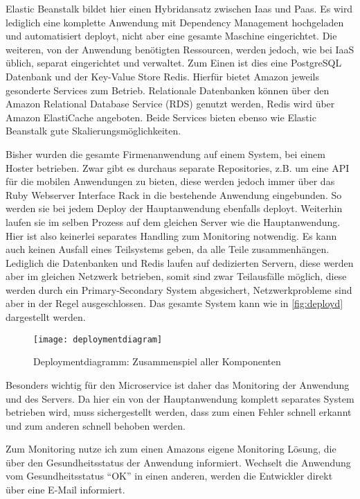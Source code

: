 Elastic Beanstalk bildet hier einen Hybridansatz zwischen Iaas und Paas. Es wird lediglich eine komplette Anwendung mit Dependency Management hochgeladen und automatisiert deployt, nicht aber eine gesamte Maschine eingerichtet.
Die weiteren, von der Anwendung benötigten Ressourcen, werden jedoch, wie bei IaaS üblich, separat eingerichtet und verwaltet. Zum Einen ist dies eine PostgreSQL Datenbank und der Key-Value Store Redis. Hierfür bietet Amazon jeweils gesonderte Services zum Betrieb. Relationale Datenbanken können über den Amazon Relational Database Service (RDS) \cite{aws:rds} genutzt werden, Redis wird über Amazon ElastiCache \cite{aws:elasticache} angeboten. Beide Services bieten ebenso wie Elastic Beanstalk gute Skalierungsmöglichkeiten.

Bisher wurden die gesamte Firmenanwendung auf einem System, bei einem Hoster betrieben. Zwar gibt es durchaus separate Repositories, z.B. um eine API für die mobilen Anwendungen zu bieten, diese werden jedoch immer über das Ruby Webserver Interface Rack in die bestehende Anwendung eingebunden. So werden sie bei jedem Deploy der Hauptanwendung ebenfalls deployt. Weiterhin laufen sie im selben Prozess auf dem gleichen Server wie die Hauptanwendung. Hier ist also keinerlei separates Handling zum Monitoring notwendig. Es kann auch keinen Ausfall eines Teilsystems geben, da alle Teile zusammenhängen. Lediglich die Datenbanken und Redis laufen auf dedizierten Servern, diese werden aber im gleichen Netzwerk betrieben, somit sind zwar Teilausfälle möglich, diese werden durch ein Primary-Secondary System abgesichert, Netzwerkprobleme sind aber in der Regel ausgeschlossen. Das gesamte System kann wie in \autoref{fig:deployd} dargestellt werden.

\begin{figure}[!ht]
    \centering
    \caption{Deploymentdiagramm: Zusammenspiel aller Komponenten}
    \label{fig:deployd}
    \texttt{[image: deploymentdiagram]}
\end{figure}

Besonders wichtig für den Microservice ist daher das Monitoring der Anwendung und des Servers. Da hier ein von der Hauptanwendung komplett separates System betrieben wird, muss sichergestellt werden, dass zum einen Fehler schnell erkannt und zum anderen schnell behoben werden. 

Zum Monitoring nutze ich zum einen Amazons eigene Monitoring Lösung, die über den Gesundheitsstatus der Anwendung informiert. Wechselt die Anwendung vom Gesundheitsstatus ``OK'' in einen anderen, werden die Entwickler direkt über eine E-Mail informiert.

